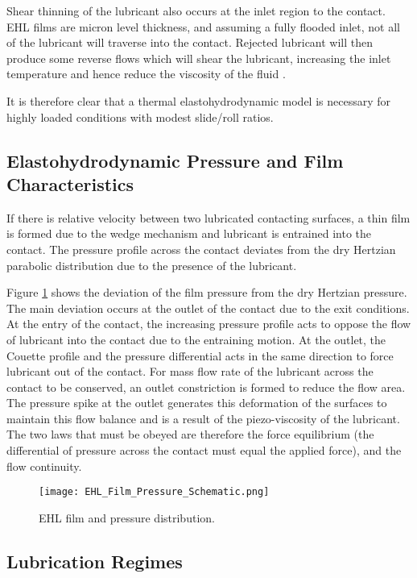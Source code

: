 Shear thinning of the lubricant also occurs at the inlet region to the contact. EHL films are micron level thickness, and assuming a fully flooded inlet, not all of the lubricant will traverse into the contact. Rejected lubricant will then produce some reverse flows which will shear the lubricant, increasing the inlet temperature and hence reduce the viscosity of the fluid \cite{Stribeck1907}.

It is therefore clear that a thermal elastohydrodynamic model is necessary for highly loaded conditions with modest slide/roll ratios.

\subsection{Elastohydrodynamic Pressure and Film Characteristics}

If there is relative velocity between two lubricated contacting surfaces, a thin film is formed due to the wedge mechanism and lubricant is entrained into the contact. The pressure profile across the contact deviates from the dry Hertzian parabolic distribution due to the presence of the lubricant.

Figure \ref{EHL_Film_Pressure_Schematic} shows the deviation of the film pressure from the dry Hertzian pressure. The main deviation occurs at the outlet of the contact due to the exit conditions. At the entry of the contact, the increasing pressure profile acts to oppose the flow of lubricant into the contact due to the entraining motion. At the outlet, the Couette profile and the pressure differential acts in the same direction to force lubricant out of the contact. For mass flow rate of the lubricant across the contact to be conserved, an outlet constriction is formed to reduce the flow area. The pressure spike at the outlet generates this deformation of the surfaces to maintain this flow balance and is a result of the piezo-viscosity of the lubricant. The two laws that must be obeyed are therefore the force equilibrium (the differential of pressure across the contact must equal the applied force), and the flow continuity.

\begin{figure}
	\centerline{\texttt{[image: EHL\_Film\_Pressure\_Schematic.png]}}
	\caption[EHL film and pressure distribution.]{EHL film and pressure distribution. \cite{Larsson2013}}
	\label{EHL_Film_Pressure_Schematic}
\end{figure}

\subsection{Lubrication Regimes}

